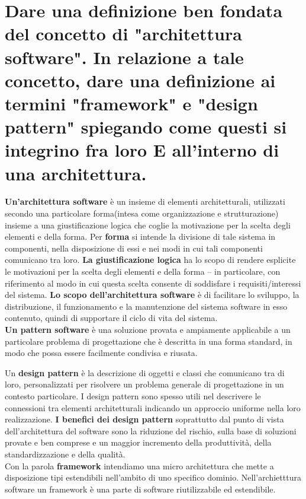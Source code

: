 \section{Dare una definizione ben fondata del concetto di "architettura software". In relazione a tale concetto, dare una definizione ai termini "framework" e "design pattern" spiegando come questi si integrino fra loro E all'interno di una architettura. }

\textbf{Un'architettura software} è un insieme di elementi architetturali, utilizzati secondo una particolare forma(intesa come organizzazione e strutturazione) insieme a una giustificazione logica che coglie la motivazione per la scelta degli elementi e della forma. Per  \textbf{forma} si intende la divisione di tale sistema in componenti, nella disposizione di essi e nei modi in cui tali componenti comunicano tra loro. \textbf{La giustificazione logica} ha lo scopo di rendere esplicite le motivazioni per la scelta degli elementi e della forma – in particolare, con riferimento al modo in cui questa scelta consente di soddisfare i requisiti/interessi del sistema.
\textbf{Lo scopo dell'architettura software} è di facilitare lo sviluppo, la distribuzione, il funzionamento e la manutenzione del sistema software in esso contenuto, quindi di supportare il ciclo di vita del sistema. \\

\textbf{Un pattern software} è una soluzione provata e ampiamente applicabile a un particolare problema di progettazione che è descritta in una forma standard, in modo che possa essere facilmente condivisa e riusata. 

Un \textbf{design pattern} è la descrizione di oggetti e classi che comunicano tra di loro, personalizzati per risolvere un problema generale di progettazione in un contesto particolare. I design pattern sono spesso utili nel descrivere le connessioni tra elementi architetturali indicando un approccio uniforme nella loro realizzazione.
\textbf{I benefici dei design pattern} soprattutto dal punto di vista dell’architettura del software sono la riduzione del rischio, sulla base di soluzioni provate e ben comprese e un maggior incremento della produttività, della standardizzazione e della qualità. \\

Con la parola \textbf{framework} intendiamo una micro architettura che mette a disposizione tipi estendibili nell'ambito di uno specifico dominio. Nell'archietttura software un framework è una parte di software riutilizzabile ed estendibile.